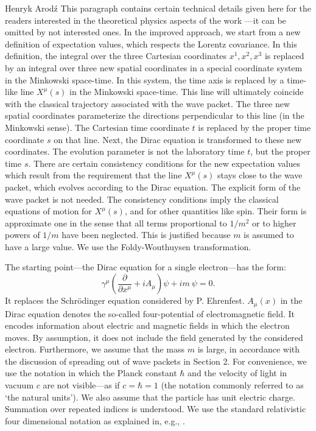 \begin{artengenv}{Henryk Arod\'z}
This paragraph contains certain technical details given here for the readers interested in the theoretical physics aspects of the work \parencite{aro1}---it can be omitted by not interested ones. In the improved approach, we start from a new definition of expectation values, which respects the Lorentz covariance. In this definition, the integral over the three Cartesian coordinates $x^1, x^2, x^3$ is replaced by an integral over 
three new spatial coordinates in a special coordinate system in the Minkowski space-time. In this system, the time axis is replaced by 
a time-like line $X^{\mu}(s)$ in the Minkowski space-time. This line will ultimately coincide with the classical trajectory associated with the wave packet. The three new spatial coordinates parameterize the directions perpendicular to this line (in the Minkowski sense).
The Cartesian time coordinate $t$ is replaced by the proper time coordinate $s$ on that line. Next, the Dirac equation is transformed to these new coordinates. The evolution parameter is not the laboratory time $t$, but the proper time $s$. There are certain consistency conditions for the new expectation values which result from the requirement that 
the line $X^{\mu}(s)$ stays close to the wave packet, which evolves according to the Dirac equation. The explicit form of the wave packet is not needed. The consistency conditions imply the classical 
equations of motion for $X^{\mu}(s)$, and for other quantities like spin. Their form is approximate one in the sense that all terms proportional to $1/m^2$ or to higher powers of $1/m$ have been neglected. This is justified because $m$ is assumed to have a large value. We use the Foldy-Wouthuysen transformation. 


The starting point---the Dirac equation for a single electron---has the form: 
\[ \gamma^{\mu} \left(\frac{\partial}{\partial x^{\mu}} + i A_{\mu}\right)\psi + i m \: \psi =0. \]
It replaces the Schr\"odinger equation considered by P. Ehrenfest. 
 $A_{\mu}(x)$ in the Dirac equation denotes the so-called four-potential of electromagnetic field. It encodes information about electric and magnetic fields in which the electron moves. By assumption, it does not include the field generated by the considered electron. Furthermore, we assume that the mass $m$ is large, in accordance with the discussion of spreading out of wave packets in Section 2. For convenience, we use the notation in which the Planck constant $\hbar$ and the velocity of light in vacuum $c$ are not visible---as if $c=\hbar =1$ (the notation commonly referred to as `the natural units'). 
We also assume that the particle has unit electric charge. Summation over repeated indices is understood. We use the standard relativistic four dimensional notation as explained in, e.g., \parencite[chap.1--2]{relat}.



\end{artengenv}
